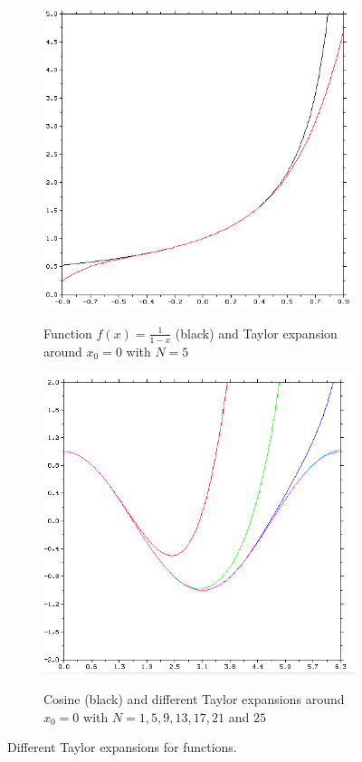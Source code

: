 \begin{figure}
\begin{subfigure}[h]{0.5\textwidth}
        \includegraphics[width = \textwidth]{./doc/Figures/Taylor2.png}  \\
        \caption{Function $f(x) = \frac{1}{1-x}$ (black) and Taylor expansion around $x_0 = 0$ with $N = 5$}
        \label{fig:Taylor2}
    \end{subfigure}    

    \centering
    \begin{subfigure}[h]{0.5\textwidth}
        \centering
        \includegraphics[width = \textwidth]{./doc/Figures/Taylor3.png}  \\
        \caption{Cosine (black) and different Taylor expansions around $x_0 = 0$ with $N = 1, 5, 9, 13, 17, 21$ and $25$}
        \label{fig:Taylor3}
    \end{subfigure}
    \caption{Different Taylor expansions for functions.}   \label{fig:Taylor}
\end{figure}
